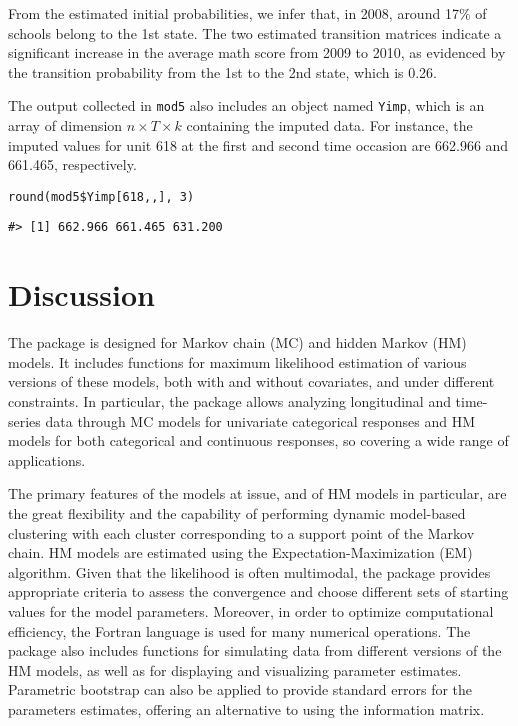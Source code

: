 From the estimated initial probabilities, we infer that, in 2008, around
17\% of schools belong to the 1st state. The two estimated transition
matrices indicate a significant increase in the average math score from 2009 to 2010, as evidenced by the transition probability from
the 1st to the 2nd state, which is 0.26.

The output collected in \texttt{mod5} also includes an object named \texttt{Yimp},
which is an array of dimension \(n \times T \times k\) containing the
imputed data. For instance, the imputed values for unit 618 at the first
and second time occasion are 662.966 and 661.465, respectively.

\begin{verbatim}
round(mod5$Yimp[618,,], 3)
\end{verbatim}

\begin{verbatim}
#> [1] 662.966 661.465 631.200
\end{verbatim}

\hypertarget{sec:conc}{%
\section{Discussion}\label{sec:conc}}

The  package is designed for Markov chain (MC) and hidden
Markov (HM) models. It includes functions for maximum likelihood
estimation of various versions of these models, both with and without
covariates, and under different constraints. In particular, the package
allows analyzing longitudinal and time-series data through MC models for
univariate categorical responses and HM models for both categorical and
continuous responses, so covering a wide range of applications.

The primary features of the models at issue, and of HM models in
particular, are the great flexibility and the capability of performing
dynamic model-based clustering with each cluster corresponding to a
support point of the Markov chain. HM models are estimated using the
Expectation-Maximization (EM) algorithm. Given that the likelihood is
often multimodal, the package provides appropriate criteria to assess
the convergence and choose different sets of starting values for the
model parameters. Moreover, in order to optimize computational
efficiency, the Fortran language is used for many numerical operations.
The package also includes functions for simulating data from different
versions of the HM models, as well as for displaying and visualizing
parameter estimates. Parametric bootstrap can also be applied to provide
standard errors for the parameters estimates, offering an alternative to
using the information matrix.

